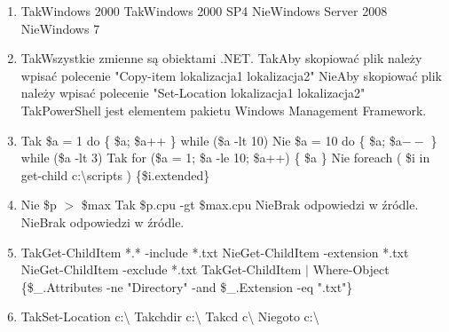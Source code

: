 \begin{enumerate}
		\newpage
		\item {}%
		{Tak}{Windows 2000}%
		{Tak}{Windows 2000 SP4}
		{Nie}{Windows Server 2008}%
		{Nie}{Windows 7}%
		\item {}%
		{Tak}{Wszystkie zmienne są obiektami .NET.}%
		{Tak}{Aby skopiować plik należy wpisać polecenie "Copy-item lokalizacja1 lokalizacja2"}%
		{Nie}{Aby skopiować plik należy wpisać polecenie "Set-Location lokalizacja1 lokalizacja2"}%
		{Tak}{PowerShell jest elementem pakietu Windows Management Framework.}
		\item {}%
		{Tak}{ \$a = 1 do \{ \$a; \$a++ \} while (\$a -lt 10) }%
		{Nie}{ \$a = 10 do \{ \$a; \$a$ -- $ \} while (\$a -lt 3) }%
		{Tak}{ for (\$a = 1; \$a -le 10; \$a++) \{ \$a \} }%
		{Nie}{ foreach ( \$i in get-child c:\textbackslash scripts ) \{\$i.extended\} }
		\item {}%
		{Nie}{ \$p $ > $ \$max }%
		{Tak}{ \$p.cpu -gt \$max.cpu }%
		{Nie}{Brak odpowiedzi w źródle.}%
		{Nie}{Brak odpowiedzi w źródle.}
		\item {}%
		{Tak}{Get-ChildItem *.* -include *.txt}%
		{Nie}{Get-ChildItem -extension *.txt}%
		{Nie}{Get-ChildItem -exclude *.txt}%
		{Tak}{Get-ChildItem $ \mid $ Where-Object \{\$\_.Attributes -ne "Directory" -and \$\_.Extension -eq ".txt"\}}
		\item {}%
		{Tak}{Set-Location c:\textbackslash}%
		{Tak}{chdir c:\textbackslash}%
		{Tak}{cd c\textbackslash}%
		{Nie}{goto c:\textbackslash}
		

\end{enumerate}
